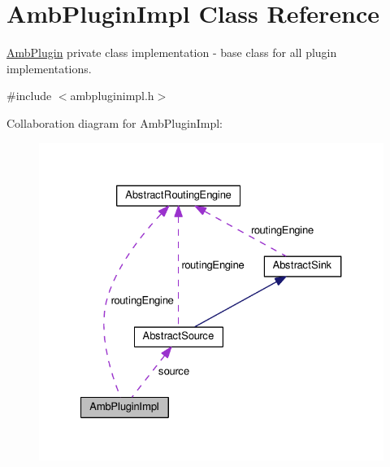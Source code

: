 \hypertarget{classAmbPluginImpl}{\section{Amb\+Plugin\+Impl Class Reference}
\label{classAmbPluginImpl}
}


\hyperlink{classAmbPlugin}{Amb\+Plugin} private class implementation -\/ base class for all plugin implementations.  




{\ttfamily \#include $<$ambpluginimpl.\+h$>$}



Collaboration diagram for Amb\+Plugin\+Impl\+:\nopagebreak
\begin{figure}[H]
\begin{center}
\leavevmode
\includegraphics[width=327pt]{classAmbPluginImpl__coll__graph}
\end{center}
\end{figure}
